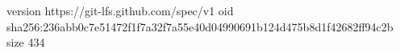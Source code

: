 version https://git-lfs.github.com/spec/v1
oid sha256:236abb0c7e51472f1f7a32f7a55e40d04990691b124d475b8d1f42682ff94c2b
size 434
